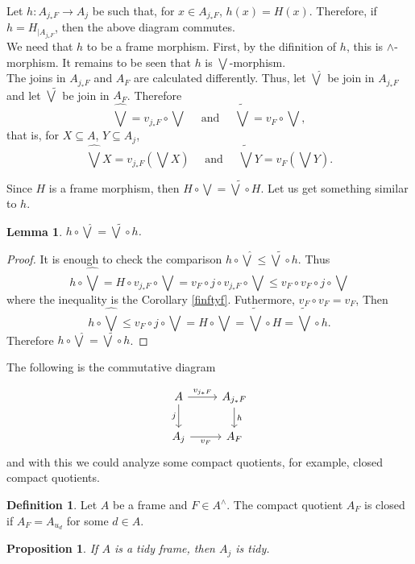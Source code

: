 \documentclass[11pt]{amsart}
\theoremstyle{plain}
\newtheorem{lem}[thm]{Lemma}
\newtheorem{prop}[thm]{Proposition}
\theoremstyle{definition}
\newtheorem{dfn}[thm]{Definition}
\begin{document}
Let $h\colon A_{j_*F}\to A_j$ be such that, for $x\in A_{j_*F}$, $h(x)=H(x)$. Therefore, if $h=H_{\mid{A_{j_*F}}}$, then the above diagram commutes.\\

We need that $h$ to be a frame morphism. First, by the difinition of $h$, this is $\wedge$-morphism. It remains to be seen that $h$ is $\bigvee$-morphism.\\

The joins in $A_{j_*F}$ and $A_F$ are calculated differently. Thus, let $\hat{\bigvee}$ be join in $A_{j_*F}$ and let $\tilde{\bigvee}$ be join in $A_F$. Therefore
\[
\hat{\bigvee}=v_{j_*F}\circ \bigvee\quad\mbox{ and }\quad \tilde{\bigvee}=v_{F}\circ \bigvee,
\] 
that is, for $X\subseteq A$, $Y\subseteq A_j$,
\[
	\hat{\bigvee}X=v_{j_*F}(\bigvee X)\quad\mbox{ and }\quad \tilde{\bigvee}Y=v_{F}(\bigvee Y).
\]

Since $H$ is a frame morphism, then $H\circ \bigvee=\tilde{\bigvee}\circ H$. Let us get something similar to $h$.

\begin{lem}\label{bigvee g}
$h\circ \hat{\bigvee}=\tilde{\bigvee}\circ h$.
\end{lem}

\begin{proof}
It is enough to check the comparison $h\circ \hat{\bigvee}\leq \tilde{\bigvee}\circ h$. Thus
\[
h\circ \hat{\bigvee}=H\circ v_{j_*F}\circ \bigvee=v_F\circ j\circ v_{j_*F}\circ \bigvee\leq v_F\circ v_F\circ j\circ \bigvee
\]
where the inequality is the Corollary \ref{finftyf}. Futhermore, $v_F\circ v_F=v_F$, Then
\[
h\circ\hat{\bigvee}\leq v_F\circ j\circ \bigvee =H\circ \bigvee=\tilde{\bigvee}\circ H=\tilde{\bigvee}\circ h.
\]
Therefore $h\circ\hat{\bigvee}=\tilde{\bigvee}\circ h$.
\end{proof}

The following is the commutative diagram

\[\begin{tikzcd}
	A & {A_{j_*F}} \\
	{A_j} & {A_F}
	\arrow["{v_{j_*F}}", from=1-1, to=1-2]
	\arrow["j"', from=1-1, to=2-1]
	\arrow["h", from=1-2, to=2-2]
	\arrow["{v_F}"', from=2-1, to=2-2]
\end{tikzcd}\]
and with this we could analyze some compact quotients, for example, closed compact quotients.

\begin{dfn}\label{ccquotien}
Let $A$ be a frame and $F\in A^\wedge$. The compact quotient $A_F$ is closed if $A_F=A_{u_d}$ for some $d\in A$.
\end{dfn}
\begin{prop}\label{tidyquout}
    If $A$ is a tidy frame, then $A_j$ is tidy.
\end{prop}
\end{document}
